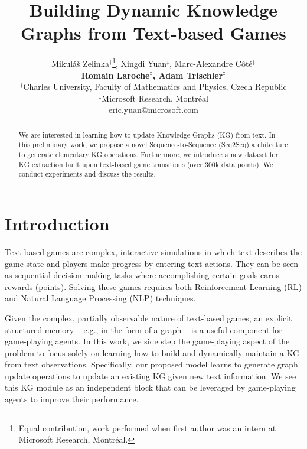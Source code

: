 \documentclass{article}
\title{Building Dynamic Knowledge Graphs from Text-based Games}
\author{Mikul\'{a}\v{s} Zelinka$^\dag$\thanks{Equal contribution, work performed when first author was an intern at Microsoft Research, Montr\'{e}al.}, Xingdi Yuan$^\ddag$\footnotemark[1], Marc-Alexandre C\^ot\'{e}$^\ddag$\footnotemark[1] \\
\textbf{Romain Laroche$^\ddag$, Adam Trischler$^\ddag$}\\
$^\dag$Charles University, Faculty of Mathematics and Physics, Czech Republic \\
$^\ddag$Microsoft Research, Montr\'{e}al \\
eric.yuan@microsoft.com
}
\newcommand\mikulas[1]{\textcolor{color2}{Mikulas: #1}}
\begin{document}
\maketitle

\begin{abstract}
We are interested in learning how to update Knowledge Graphs (KG) from text.
In this preliminary work, we propose a novel Sequence-to-Sequence (Seq2Seq) architecture to generate elementary KG operations.
Furthermore, we introduce a new dataset for KG extraction built upon text-based game transitions (over 300k data points).
We conduct experiments and discuss the results.
\end{abstract}

\section{Introduction}

Text-based games are complex, interactive simulations in which text describes the game state and players make progress by entering text actions. 
They can be seen as sequential decision making tasks where accomplishing certain goals earns rewards (points).
Solving these games requires both Reinforcement Learning (RL) and Natural Language Processing (NLP) techniques. 

Given the complex, partially observable nature of text-based games, an explicit structured memory -- e.g., in the form of a graph -- is a useful component for game-playing agents.
In this work, we side step the game-playing aspect of the problem to focus solely on learning how to build and dynamically maintain a KG from text observations. Specifically, our proposed model learns to generate graph update operations to update an existing KG given new text information. We see this KG module as an independent block that can be leveraged by game-playing agents to improve their performance.

\end{document}
